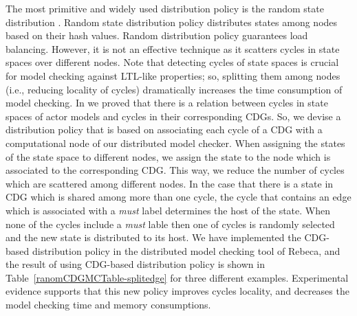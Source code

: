 The most primitive and widely used distribution policy is the random state distribution \cite{DBLP:journals/entcs/GaravelMS13}. Random state distribution policy distributes states among nodes based on their hash values. Random distribution policy guarantees load balancing. However, it is not an effective technique as it scatters cycles in state spaces over different nodes. Note that detecting cycles of state spaces is crucial for model checking against LTL-like properties; so, splitting them among nodes (i.e., reducing locality of cycles) dramatically increases the time consumption of model checking. %
%
In \cite{DBLP:journals/eceasst/KhamespanahSMSR15} we proved that there is a relation between cycles in state spaces of actor models 
and cycles in their corresponding CDGs.
So, we devise a distribution policy that is based on
associating each cycle of a CDG with a computational node of our distributed model checker. When assigning the states of the state space to different nodes, we assign the state to the node which is associated to the corresponding CDG. This way, we reduce the number of cycles which are scattered among different nodes.
%
In the case that there is a state in CDG which is shared among more than one cycle, the cycle that contains an edge which is associated with a \emph{must} label determines the host of the state. 
%
When none of the cycles include a \emph{must} lable then one of  cycles is randomly selected and the new state is distributed to its host. 
%
We have implemented the CDG-based distribution policy in the distributed model checking tool of Rebeca, and the result of using CDG-based distribution policy is shown in Table~\ref{ranomCDGMCTable-splitedge} for three different examples. Experimental evidence supports that this new policy improves cycles locality, and decreases the model checking time and memory consumptions. %

